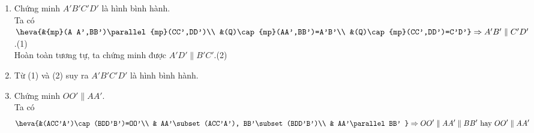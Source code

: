 \begin{ex}
{\begin{enumerate}
\begin{center}
		\end{center}
		\item Chứng minh $A'B'C'D'$ là hình bình hành.\\
		Ta có $\heva{&{mp}(A A',BB')\parallel{mp}(CC',DD')\\ &(Q)\cap{mp}(AA',BB')=A'B'\\ &(Q)\cap{mp}(CC',DD')=C'D'}\Rightarrow A'B'\parallel C'D'$.\quad (1)\\
		Hoàn toàn tương tự, ta chứng minh được $A'D'\parallel B'C'$.\quad (2)
		\item Từ (1) và (2) suy ra $A'B'C'D'$ là hình bình hành.
		\item Chứng minh $O O'\parallel  A A'$. \\
		Ta có
		$$\heva{&(ACC'A')\cap(BDD'B')=OO'\\ &				
				AA'\subset(ACC'A'), BB'\subset(BDD'B')\\ &
				AA'\parallel  BB'
				}\Rightarrow OO'\parallel  AA'\parallel BB'\text{ hay }OO'\parallel  AA'$$
		\end{enumerate}
		}
\end{ex}
